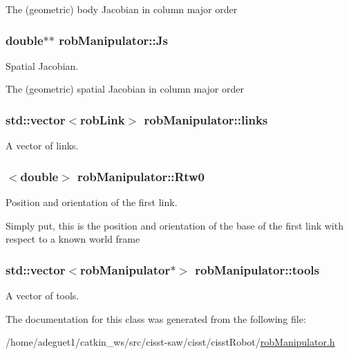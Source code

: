 The (geometric) body Jacobian in column major order \hypertarget{classrob_manipulator_a5c8636fedd8f1a77ea297f87527cb85e}{
\subsubsection[{Js}]{\setlength{\rightskip}{0pt plus 5cm}double$\ast$$\ast$ rob\-Manipulator\-::\-Js}}\label{classrob_manipulator_a5c8636fedd8f1a77ea297f87527cb85e}


Spatial Jacobian. 

The (geometric) spatial Jacobian in column major order \hypertarget{classrob_manipulator_a255e6fb341202762ad75a54c1d040eda}{
\subsubsection[{links}]{\setlength{\rightskip}{0pt plus 5cm}std\-::vector$<${\bf rob\-Link}$>$ rob\-Manipulator\-::links}}\label{classrob_manipulator_a255e6fb341202762ad75a54c1d040eda}


A vector of links. 

\hypertarget{classrob_manipulator_ab48d9d9a166bf252698bc35788ca6ad6}{
\subsubsection[{Rtw0}]{$<$double$>$ rob\-Manipulator\-::\-Rtw0}}\label{classrob_manipulator_ab48d9d9a166bf252698bc35788ca6ad6}


Position and orientation of the first link. 

Simply put, this is the position and orientation of the base of the first link with respect to a known world frame \hypertarget{classrob_manipulator_ae52a521233de4461f871291dbbe4858a}{
\subsubsection[{tools}]{\setlength{\rightskip}{0pt plus 5cm}std\-::vector$<${\bf rob\-Manipulator}$\ast$$>$ rob\-Manipulator\-::tools\hspace{0.3cm}{\ttfamily [protected]}}}\label{classrob_manipulator_ae52a521233de4461f871291dbbe4858a}


A vector of tools. 



The documentation for this class was generated from the following file\-:\begin{DoxyCompactItemize}
\item 
/home/adeguet1/catkin\-\_\-ws/src/cisst-\/saw/cisst/cisst\-Robot/\hyperlink{rob_manipulator_8h}{rob\-Manipulator.\-h}\end{DoxyCompactItemize}
